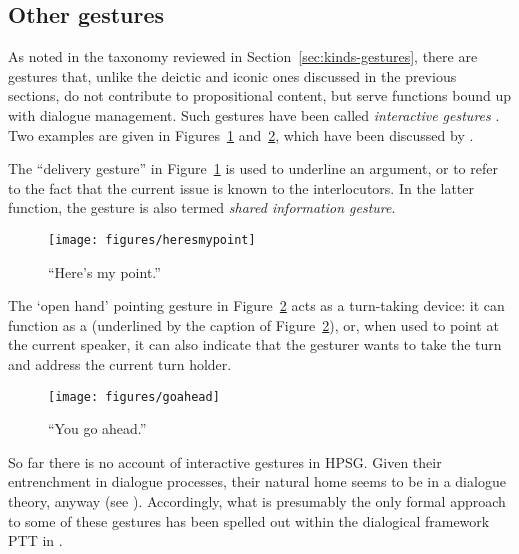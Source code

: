 \documentclass[output=paper
 	        ,biblatex
                ,babelshorthands
                ,newtxmath
                ,draftmode
                ,colorlinks, citecolor=brown
]{langscibook}
\begin{document}
\subsection{Other gestures}
\label{sec:other-gestures}

As noted in the taxonomy reviewed in Section~\ref{sec:kinds-gestures}, there are gestures that, unlike the deictic and iconic ones discussed in the previous sections, do not contribute to propositional content, but serve functions bound up with dialogue management.
%
Such gestures have been called \emph{interactive gestures} \citep{Bavelas:Chovil:Lawrie:Wade:1992}.
%
Two examples are given in Figures~\ref{fig:mypoint} and~\ref{fig:yourturn}, which have been discussed by \citet{Bavelas:Chovil:Coates:Roe:1995}.


The \enquote{delivery gesture} in Figure~\ref{fig:mypoint} is used to underline an argument, or to refer to the fact that the current issue is known to the interlocutors. 
%
In the latter function, the gesture is also termed \emph{shared information gesture}.

\begin{figure}
  \centering
  \texttt{[image: figures/heresmypoint]}
\caption{\enquote{Here's my point.}}
\label{fig:mypoint}
\end{figure}


The \enquote*{open hand} pointing gesture in Figure~\ref{fig:yourturn} acts as a turn-taking device: it can function as a  (underlined by the caption of Figure~\ref{fig:yourturn}), or, when used to point at the current speaker, it can also indicate that the gesturer wants to take the turn and address the current turn holder.

\begin{figure}
  \centering
  \texttt{[image: figures/goahead]}
\caption{\enquote{You go ahead.}}
\label{fig:yourturn}
\end{figure}

So far there is no account of interactive gestures in HPSG. 
%
Given their entrenchment in dialogue processes, their natural home seems to be in a dialogue theory, anyway (see ).
%
Accordingly, what is presumably the only formal approach to some of these gestures has been spelled out within the dialogical framework PTT in \citet{Rieser:Poesio:2009}.
\end{document}
